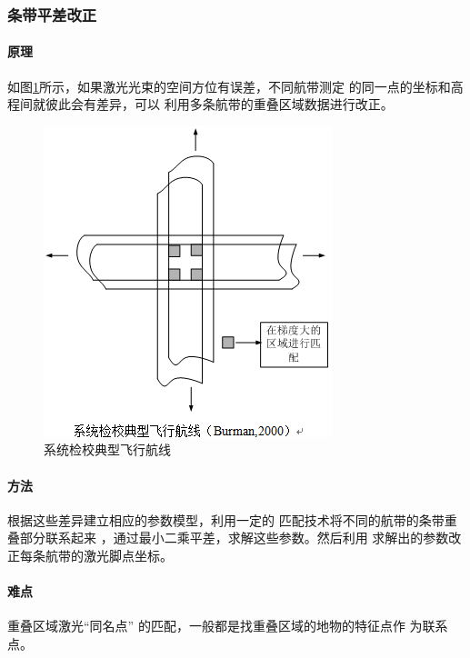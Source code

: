 \subsubsection{条带平差改正}

\paragraph{原理}
如图\ref{fig:系统检校典型飞行航线}所示，如果激光光束的空间方位有误差，不同航带测定
的同一点的坐标和高程间就彼此会有差异，可以
利用多条航带的重叠区域数据进行改正。
\begin{figure}[htbp]
	\centering
	\includegraphics[width=0.4\linewidth]{figure/Chapter8/系统检校典型飞行航线}
	\caption{系统检校典型飞行航线}
	\label{fig:系统检校典型飞行航线}
\end{figure}


\paragraph{方法}
根据这些差异建立相应的参数模型，利用一定的
匹配技术将不同的航带的条带重叠部分联系起来
，通过最小二乘平差，求解这些参数。然后利用
求解出的参数改正每条航带的激光脚点坐标。

\paragraph{难点}
重叠区域激光“同名点” 的匹配，一般都是找重叠区域的地物的特征点作
为联系点。

